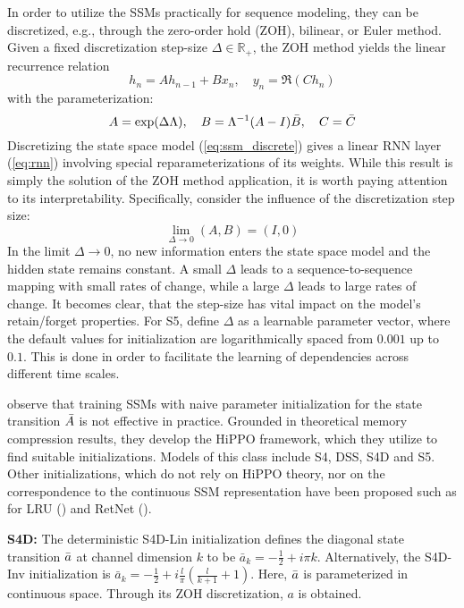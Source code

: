 \documentclass{article} \usepackage{iclr2024_conference,times}
\begin{document}
In order to utilize the SSMs practically for sequence modeling, they can be discretized, e.g., through the zero-order hold (ZOH), bilinear, or Euler method. Given a fixed discretization step-size \( \Delta \in \mathbb{R_{+}} \), the ZOH method yields the linear recurrence relation
\begin{equation}\label{eq:ssm_discrete}
h_n = A h_{n-1} + B x_n, \quad y_n = \Re(C h_n)
\end{equation}
with the parameterization:
\begin{equation}
A = \exp(\Delta \Lambda), \quad B = \Lambda^{-1}(A-I)\Bar{B}, \quad C = \Bar{C}
\end{equation}
Discretizing the state space model (\ref{eq:ssm_discrete}) gives a linear RNN layer (\ref{eq:rnn}) involving special reparameterizations of its weights. While this result is simply the solution of the ZOH method application, it is worth paying attention to its interpretability. Specifically, consider the influence of the discretization step size:
\begin{equation}
\lim_{{\Delta \to 0}}(A, B) = (I, 0)
\end{equation}
In the limit $\Delta \to 0$, no new information enters the state space model and the hidden state remains constant. A small $\Delta$ leads to a sequence-to-sequence mapping with small rates of change, while a large $\Delta$ leads to large rates of change. It becomes clear, that the step-size has vital impact on the model's retain/forget properties. For S5, \cite{smith2023simplified} define $\Delta$ as a learnable parameter vector, where the default values for initialization are logarithmically spaced from $0.001$ up to $0.1$. This is done in order to facilitate the learning of dependencies across different time scales. 

\cite{gu2022efficiently} observe that training SSMs with naive parameter initialization for the state transition $\Bar{A}$ is not effective in practice. Grounded in theoretical memory compression results, they develop the HiPPO framework, which they utilize to find suitable initializations. Models of this class include S4, DSS, S4D and S5. Other initializations, which do not rely on HiPPO theory, nor on the correspondence to the continuous SSM representation have been proposed such as for LRU (\cite{orvieto2023resurrecting}) and RetNet (\cite{sun2023retentive}). 

\textbf{S4D:} The deterministic S4D-Lin initialization defines the diagonal state transition $\Bar{a}$ at channel dimension $k$ to be \( \bar{a}_k = -\frac{1}{2} + i \pi k\). Alternatively, the S4D-Inv initialization is $\bar{a}_k = -\frac{1}{2} + i\frac{l}{\pi} (\frac{l}{k+1} + 1)$. Here, $\Bar{a}$ is parameterized in continuous space. Through its ZOH discretization, $a$ is obtained.
\end{document}
